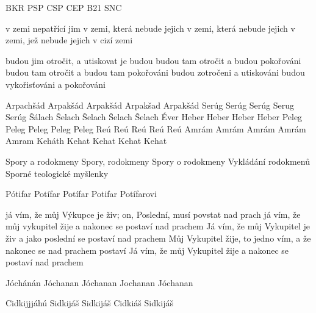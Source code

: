  {BKR} {PSP} {CSP} {CEP} {B21} {SNC} 


      {v zemi nepatřící jim} 
      {v zemi, která nebude jejich} 
      {v zemi, která nebude jejich} 
      {v zemi, jež nebude jejich} 
      {v cizí zemi} 

      {budou jim otročit, a utiskovat je budou}
      {budou tam otročit a budou pokořováni} 
      {budou tam otročit a budou tam pokořováni} 
      {budou zotročeni a utiskováni} 
      {budou vykořisťováni a pokořováni} 

 {Arpachšád} {Arpakšád} {Arpakšád} {Arpakšad} {Arpakšád}
   {Serúg}     {Serúg}    {Serúg}    {Serug}    {Serúg}   
    {Šálach}    {Šelach}   {Šelach}   {Šelach}   {Šelach}  
   {Éver}      {Heber}    {Heber}    {Heber}    {Heber}   
   {Peleg}     {Peleg}    {Peleg}    {Peleg}    {Peleg}   
    {Reú}       {Reú}      {Reú}      {Reú}      {Reú}     
 {Amrám} {Amrám} {Amrám} {Amrám} {Amram} 
 {Keháth} {Kehat} {Kehat} {Kehat} {Kehat} 


        {Spory a rodokmeny} 
        {Spory, rodokmeny} 
        {Spory o rodokmeny} 
        {Vykládání rodokmenů} 
        {Sporné teologické myšlenky} 
        
 {Pótifar} {Potífar} {Potífar} {Potifar} {Potífarovi} 

        {já vím, že můj Výkupce je živ; on, Poslední, musí povstat nad prach}  %
        {já vím, že můj vykupitel žije a nakonec se postaví nad prachem}  %
        {Já vím, že můj Vykupitel je živ a jako poslední se postaví nad prachem}  %
        {Můj Vykupitel žije, to jedno vím, a že nakonec se nad prachem postaví}  %
        {Já vím, že můj Vykupitel žije a nakonec se postaví nad prachem}  %

         
        {Jóchánán}  %
        {Jóchanan}  %
        {Jóchanan}  %
        {Jochanan}  %
        {Jóchanan}  %

        {Cidkijjjáhú}  %
        {Sidkijáš}  %
        {Sidkijáš}  %
        {Cidkiáš}  %
        {Sidkijáš}  %


